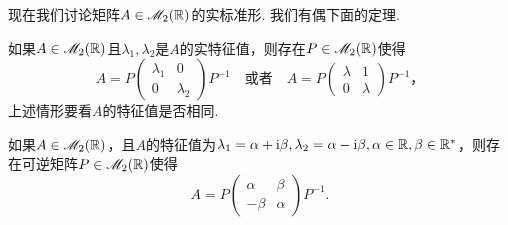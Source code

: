 现在我们讨论矩阵$A\in\mathscr M_2(\mathbb R)$的实标准形. 我们有偶下面的定理.
\begin{mybox}
  \begin{theorem}[实矩阵的实标准形.]
    \begin{enum}
      \item \label{thm2.10a}如果$A\in\mathscr M_2(\mathbb R)$且$\lambda_1,\lambda_2$是$A$的实特征值，则存在$P\in\mathscr M_2(\mathbb R)$使得
          \[
            A = P\begin{pmatrix}
              \lambda_1 & 0 \\
              0 & \lambda_2
            \end{pmatrix}P ^{-1}\quad\text{或者}\quad
            A = P\begin{pmatrix}
              \lambda & 1 \\
              0 & \lambda
            \end{pmatrix}P^{-1}，
          \]
          上述情形要看$A$的特征值是否相同.
      \item 如果$A\in\mathscr M_2(\mathbb R)$，且$A$的特征值为$\lambda_1=\alpha+\mathrm i\beta,\lambda_2=
          \alpha-\mathrm i\beta,\alpha\in\mathbb R,\beta\in\mathbb R^\ast$，则存在可逆矩阵$P\in\mathscr M_2(\mathbb R)$使得
          \[
            A = P \begin{pmatrix}
              \alpha & \beta \\
              -\beta & \alpha
            \end{pmatrix} P^{-1}.
          \]
    \end{enum}
  \end{theorem}
\end{mybox}

